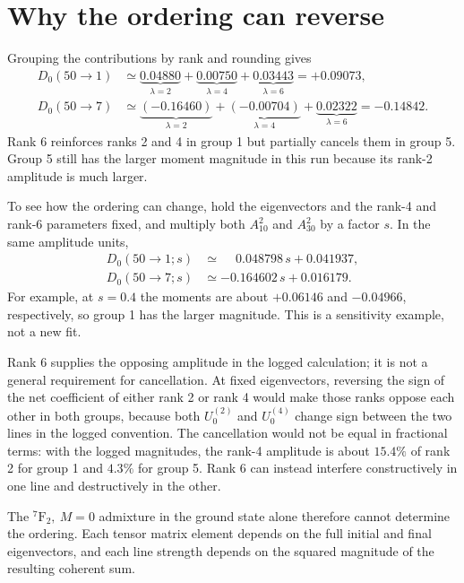 \documentclass[11pt,a4paper]{article}
\newcommand{\Ftwo}{{}^{7}\mathrm{F}_{2}}
\begin{document}
\section*{Why the ordering can reverse}

Grouping the contributions by rank and rounding gives
\begin{align*}
  D_0(50\to1) &\simeq
    \underbrace{0.04880}_{\lambda=2}
    + \underbrace{0.00750}_{\lambda=4}
    + \underbrace{0.03443}_{\lambda=6}
    = +0.09073,\\
  D_0(50\to7) &\simeq
    \underbrace{(-0.16460)}_{\lambda=2}
    + \underbrace{(-0.00704)}_{\lambda=4}
    + \underbrace{0.02322}_{\lambda=6}
    = -0.14842 .
\end{align*}
Rank 6 reinforces ranks 2 and 4 in group 1 but partially cancels
them in group 5. Group 5 still has the larger moment magnitude in
this run because its rank-2 amplitude is much larger.

To see how the ordering can change, hold the eigenvectors and the
rank-4 and rank-6 parameters fixed, and multiply both \(A^{2}_{10}\)
and \(A^{2}_{30}\) by a factor \(s\). In the same amplitude units,
\begin{align*}
  D_0(50\to1;s) &\simeq \phantom{-}0.048798\,s + 0.041937,\\
  D_0(50\to7;s) &\simeq             -0.164602\,s + 0.016179 .
\end{align*}
For example, at \(s=0.4\) the moments are about \(+0.06146\) and
\(-0.04966\), respectively, so group 1 has the larger magnitude.
This is a sensitivity example, not a new fit.

Rank 6 supplies the opposing amplitude in the logged calculation;
it is not a general requirement for cancellation. At fixed
eigenvectors, reversing the sign of the net coefficient of either
rank 2 or rank 4 would make those ranks oppose each other in both groups,
because both \(U^{(2)}_0\) and \(U^{(4)}_0\) change sign between the two
lines in the logged convention. The cancellation would not be equal
in fractional terms: with the logged magnitudes, the rank-4
amplitude is about \(15.4\%\) of rank 2 for group 1 and \(4.3\%\)
for group 5. Rank 6 can instead interfere constructively in one
line and destructively in the other.

The \(\Ftwo,\ M=0\) admixture in the ground state alone therefore
cannot determine the ordering. Each tensor matrix element depends
on the full initial and final eigenvectors, and each line strength
depends on the squared magnitude of the resulting coherent sum.
\end{document}
